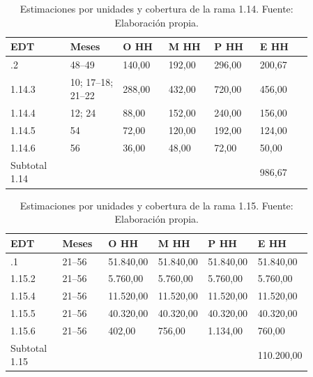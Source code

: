 \documentclass[11pt]{article}
\begin{document}
\begingroup
\small
\begin{longtable}{@{}p{0.17\linewidth}p{0.15\linewidth}p{0.13\linewidth}p{0.13\linewidth}p{0.13\linewidth}p{0.15\linewidth}@{}}
\caption[Estimaciones por unidades y cobertura de la rama 1.14]{Estimaciones por unidades y cobertura de la rama 1.14. Fuente: Elaboración propia.}\label{tab:t15-tareas-14}\\
\toprule
\textbf{EDT} & \textbf{Meses} & \textbf{O HH} & \textbf{M HH} & \textbf{P HH} & \textbf{E HH} \\
\midrule
\endhead
\bottomrule
\endlastfoot
1.14.2 & 48--49 & 140,00 & 192,00 & 296,00 & 200,67 \\
1.14.3 & 10; 17--18; 21--22 & 288,00 & 432,00 & 720,00 & 456,00 \\
1.14.4 & 12; 24 & 88,00 & 152,00 & 240,00 & 156,00 \\
1.14.5 & 54 & 72,00 & 120,00 & 192,00 & 124,00 \\
1.14.6 & 56 & 36,00 & 48,00 & 72,00 & 50,00 \\
Subtotal 1.14 &  &  &  &  & 986,67 \\
\end{longtable}
\endgroup



\begingroup
\small
\begin{longtable}{@{}p{0.17\linewidth}p{0.15\linewidth}p{0.13\linewidth}p{0.13\linewidth}p{0.13\linewidth}p{0.15\linewidth}@{}}
\caption[Estimaciones por unidades y cobertura de la rama 1.15]{Estimaciones por unidades y cobertura de la rama 1.15. Fuente: Elaboración propia.}\label{tab:t15-tareas-15}\\
\toprule
\textbf{EDT} & \textbf{Meses} & \textbf{O HH} & \textbf{M HH} & \textbf{P HH} & \textbf{E HH} \\
\midrule
\endhead
\bottomrule
\endlastfoot
1.15.1 & 21--56 & 51.840,00 & 51.840,00 & 51.840,00 & 51.840,00 \\
1.15.2 & 21--56 & 5.760,00 & 5.760,00 & 5.760,00 & 5.760,00 \\
1.15.4 & 21--56 & 11.520,00 & 11.520,00 & 11.520,00 & 11.520,00 \\
1.15.5 & 21--56 & 40.320,00 & 40.320,00 & 40.320,00 & 40.320,00 \\
1.15.6 & 21--56 & 402,00 & 756,00 & 1.134,00 & 760,00 \\
Subtotal 1.15 &  &  &  &  & 110.200,00 \\
\end{longtable}
\endgroup
\end{document}
